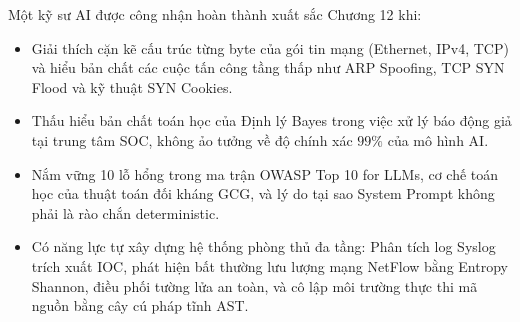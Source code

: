 \begin{checkpointbox}
Một kỹ sư AI được công nhận hoàn thành xuất sắc Chương 12 khi:
\begin{itemize}
  \item Giải thích cặn kẽ cấu trúc từng byte của gói tin mạng (Ethernet, IPv4, TCP) và hiểu bản chất các cuộc tấn công tầng thấp như ARP Spoofing, TCP SYN Flood và kỹ thuật SYN Cookies.
  \item Thấu hiểu bản chất toán học của Định lý Bayes trong việc xử lý báo động giả tại trung tâm SOC, không ảo tưởng về độ chính xác $99\%$ của mô hình AI.
  \item Nắm vững 10 lỗ hổng trong ma trận OWASP Top 10 for LLMs, cơ chế toán học của thuật toán đối kháng GCG, và lý do tại sao System Prompt không phải là rào chắn deterministic.
  \item Có năng lực tự xây dựng hệ thống phòng thủ đa tầng: Phân tích log Syslog trích xuất IOC, phát hiện bất thường lưu lượng mạng NetFlow bằng Entropy Shannon, điều phối tường lửa an toàn, và cô lập môi trường thực thi mã nguồn bằng cây cú pháp tĩnh AST.
\end{itemize}
\end{checkpointbox}
